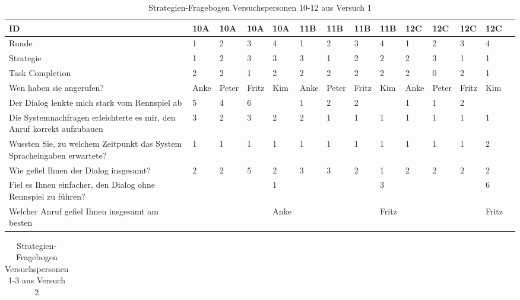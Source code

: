 \documentclass[12pt,a4paper]{scrartcl}
\begin{document}
\begin{appendix}
\begin{table}
\caption{Strategien-Fragebogen Versuchspersonen 10-12 aus Versuch 1}
\begin{tabular}{|p{6cm}| p{0.8cm} | p{0.8cm} | p{0.8cm} | p{0.8cm} || p{0.8cm} | p{0.8cm} | p{0.8cm} | p{0.8cm} || p{0.8cm} | p{0.8cm} | p{0.8cm} | p{0.8cm} | p{} | }
\hline
ID & 10A & 10A & 10A & 10A & 11B & 11B & 11B & 11B & 12C & 12C & 12C & 12C \\ \hline \hline
Runde & 1 & 2 & 3 & 4 & 1 & 2 & 3 & 4 & 1 & 2 & 3 & 4 \\ \hline
	Strategie & 1 & 2 & 3 & 3 & 3 & 1 & 2 & 2 & 2 & 3 & 1 & 1 \\ \hline \hline
	Task Completion & 2 & 2 & 1 & 2 & 2 & 2 & 2 & 2 & 2 & 0 & 2 & 1 \\ \hline \hline
	Wen haben sie angerufen? & Anke & Peter & Fritz & Kim & Anke & Peter & Fritz & Kim & Anke & Peter & Fritz & Kim \\ \hline
	Der Dialog lenkte mich stark vom Rennspiel ab & 5 & 4 & 6 &  & 1 & 2 & 2 &  & 1 & 1 & 2 &  \\ \hline
	Die Systemnachfragen erleichterte es mir, den Anruf korrekt aufzubauen & 3 & 2 & 3 & 2 & 2 & 1 & 1 & 1 & 1 & 1 & 1 & 1 \\ \hline
	Wussten Sie, zu welchem Zeitpunkt das System Spracheingaben erwartete? & 1 & 1 & 1 & 1 & 1 & 1 & 1 & 1 & 1 & 1 & 1 & 2 \\ \hline
	Wie gefiel Ihnen der Dialog insgesamt? & 2 & 2 & 5 & 2 & 3 & 3 & 2 & 1 & 2 & 2 & 2 & 2 \\ \hline
	Fiel es Ihnen einfacher, den Dialog ohne Rennspiel zu führen? &  &  &  & 1 &  &  &  & 3 &  &  &  & 6 \\ \hline
	Welcher Anruf gefiel Ihnen insgesamt am besten &  &  &  & Anke &  &  &  & Fritz &  &  &  & Fritz \\ \hline
\end{tabular}
\end{table}


\begin{table}
\caption{Strategien-Fragebogen Versuchspersonen 1-3 aus Versuch 2}
\begin{tabular}{|p{6cm}| p{0.8cm} | p{0.8cm} | p{0.8cm} | p{0.8cm} || p{0.8cm} | p{0.8cm} | p{0.8cm} | p{0.8cm} || p{0.8cm} | p{0.8cm} | p{0.8cm} | p{0.8cm} | p{} | }
\hline


\end{tabular}
\end{table}
\end{appendix}
\end{document}
